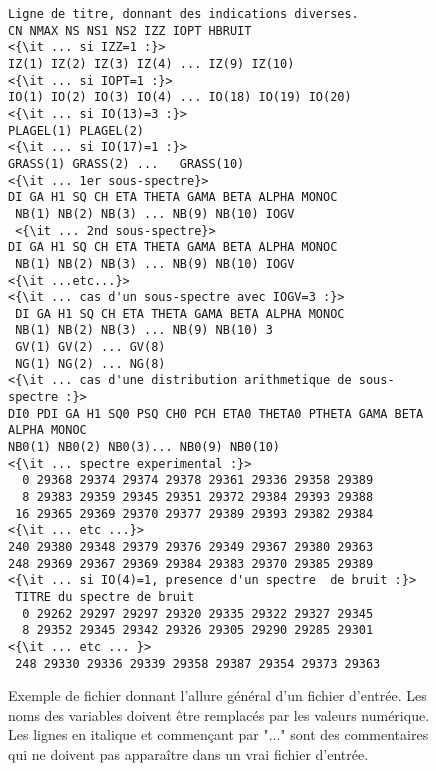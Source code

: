 \begin{figure}
\caption{\label{fig:format_fichier} 
Exemple de fichier donnant l'allure général d'un fichier d'entrée.
Les noms des variables doivent être remplacés par les valeurs numérique.
Les lignes en italique et commençant par "..." sont des commentaires qui ne doivent pas appara\^itre dans un vrai fichier d'entrée.}
\begin{lstlisting}[frame=tbl,escapeinside=<>]
Ligne de titre, donnant des indications diverses.
CN NMAX NS NS1 NS2 IZZ IOPT HBRUIT
<{\it ... si IZZ=1 :}>
IZ(1) IZ(2) IZ(3) IZ(4) ... IZ(9) IZ(10)
<{\it ... si IOPT=1 :}>
IO(1) IO(2) IO(3) IO(4) ... IO(18) IO(19) IO(20)
<{\it ... si IO(13)=3 :}>
PLAGEL(1) PLAGEL(2)
<{\it ... si IO(17)=1 :}>
GRASS(1) GRASS(2) ...   GRASS(10) 
<{\it ... 1er sous-spectre}>
DI GA H1 SQ CH ETA THETA GAMA BETA ALPHA MONOC
 NB(1) NB(2) NB(3) ... NB(9) NB(10) IOGV
 <{\it ... 2nd sous-spectre}>
DI GA H1 SQ CH ETA THETA GAMA BETA ALPHA MONOC   
 NB(1) NB(2) NB(3) ... NB(9) NB(10) IOGV
<{\it ...etc...}>
<{\it ... cas d'un sous-spectre avec IOGV=3 :}>
 DI GA H1 SQ CH ETA THETA GAMA BETA ALPHA MONOC
 NB(1) NB(2) NB(3) ... NB(9) NB(10) 3
 GV(1) GV(2) ... GV(8)
 NG(1) NG(2) ... NG(8)
<{\it ... cas d'une distribution arithmetique de sous-spectre :}>
DI0 PDI GA H1 SQ0 PSQ CH0 PCH ETA0 THETA0 PTHETA GAMA BETA ALPHA MONOC
NB0(1) NB0(2) NB0(3)... NB0(9) NB0(10)
<{\it ... spectre experimental :}>
  0 29368 29374 29374 29378 29361 29336 29358 29389
  8 29383 29359 29345 29351 29372 29384 29393 29388
 16 29365 29369 29370 29377 29389 29393 29382 29384
<{\it ... etc ...}>
240 29380 29348 29379 29376 29349 29367 29380 29363
248 29369 29367 29369 29384 29383 29370 29385 29389
<{\it ... si IO(4)=1, presence d'un spectre  de bruit :}>
 TITRE du spectre de bruit
  0 29262 29297 29297 29320 29335 29322 29327 29345
  8 29352 29345 29342 29326 29305 29290 29285 29301
<{\it ... etc ... }>
 248 29330 29336 29339 29358 29387 29354 29373 29363
 \end{lstlisting}
\end{figure}

\FloatBarrier
\newpage

